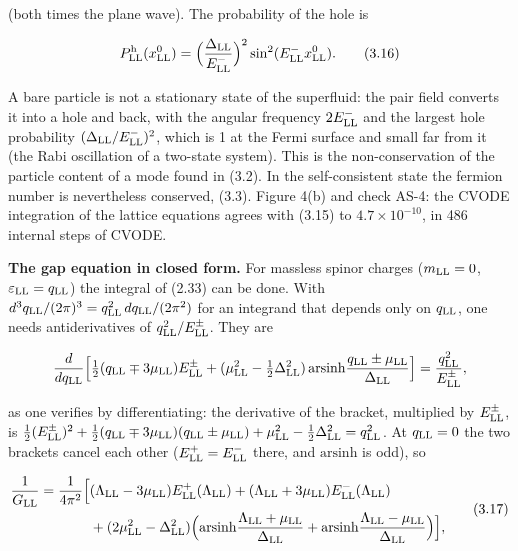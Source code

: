 \documentclass[
  10pt,
]{article}
\begin{document}
(both times the plane wave). The probability of the hole is

\[P^{\rm h}_{\rm LL}(x^0_{\rm LL})=\Big(\frac{\Delta_{\rm LL}}{E^-_{\rm LL}}\Big)^2\sin^2(E^-_{\rm LL}x^0_{\rm LL}).\tag{3.16}\]

A bare particle is not a stationary state of the superfluid: the pair
field converts it into a hole and back, with the angular frequency
\(2E^-_{\rm LL}\) and the largest hole probability
\((\Delta_{\rm LL}/E^-_{\rm LL})^2\), which is 1 at the Fermi surface
and small far from it (the Rabi oscillation of a two-state system). This
is the non-conservation of the particle content of a mode found in
(3.2). In the self-consistent state the fermion number is nevertheless
conserved, (3.3). Figure 4(b) and check AS-4: the CVODE integration of
the lattice equations agrees with (3.15) to \(4.7\times10^{-10}\), in
486 internal steps of CVODE.

\textbf{The gap equation in closed form.} For massless spinor charges
(\(m_{\rm LL}=0\), \(\varepsilon_{\rm LL}=q_{\rm LL}\)) the integral of
(2.33) can be done. With
\(d^3q_{\rm LL}/(2\pi)^3=q_{\rm LL}^2\,dq_{\rm LL}/(2\pi^2)\) for an
integrand that depends only on \(q_{\rm LL}\), one needs antiderivatives
of \(q_{\rm LL}^2/E^\pm_{\rm LL}\). They are

\[\frac{d}{dq_{\rm LL}}\Big[\tfrac12(q_{\rm LL}\mp3\mu_{\rm LL})E^\pm_{\rm LL}+(\mu_{\rm LL}^2-\tfrac12\Delta_{\rm LL}^2)\,\mathrm{arsinh}\frac{q_{\rm LL}\pm\mu_{\rm LL}}{\Delta_{\rm LL}}\Big]=\frac{q_{\rm LL}^2}{E^\pm_{\rm LL}},\]

as one verifies by differentiating: the derivative of the bracket,
multiplied by \(E^\pm_{\rm LL}\), is
\(\tfrac12(E^\pm_{\rm LL})^2+\tfrac12(q_{\rm LL}\mp3\mu_{\rm LL})(q_{\rm LL}\pm\mu_{\rm LL})+\mu_{\rm LL}^2-\tfrac12\Delta_{\rm LL}^2=q_{\rm LL}^2\).
At \(q_{\rm LL}=0\) the two brackets cancel each other
(\(E^+_{\rm LL}=E^-_{\rm LL}\) there, and \(\mathrm{arsinh}\) is odd),
so

\[\begin{aligned}\frac1{G_{\rm LL}}=\frac1{4\pi^2}\Big[&(\Lambda_{\rm LL}-3\mu_{\rm LL})E^+_{\rm LL}(\Lambda_{\rm LL})+(\Lambda_{\rm LL}+3\mu_{\rm LL})E^-_{\rm LL}(\Lambda_{\rm LL})\\&+(2\mu_{\rm LL}^2-\Delta_{\rm LL}^2)\Big(\mathrm{arsinh}\frac{\Lambda_{\rm LL}+\mu_{\rm LL}}{\Delta_{\rm LL}}+\mathrm{arsinh}\frac{\Lambda_{\rm LL}-\mu_{\rm LL}}{\Delta_{\rm LL}}\Big)\Big],\end{aligned}\tag{3.17}\]
\end{document}
